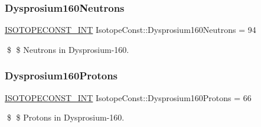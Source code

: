 \subsubsection{\texorpdfstring{Dysprosium160\+Neutrons}{Dysprosium160Neutrons}}
{\footnotesize\ttfamily \mbox{\hyperlink{group___isotope_const-_macros_ga5f18360b3e99483a35c32d789e62621c}{I\+S\+O\+T\+O\+P\+E\+C\+O\+N\+S\+T\+\_\+\+I\+NT}} Isotope\+Const\+::\+Dysprosium160\+Neutrons = 94}

\$ \$ Neutrons in Dysprosium-\/160. \mbox{\label{group___isotope_const-_dysprosium-_dy160_ga3c503660c9e9ce0a345719417b071ec7}} 
\subsubsection{\texorpdfstring{Dysprosium160\+Protons}{Dysprosium160Protons}}
{\footnotesize\ttfamily \mbox{\hyperlink{group___isotope_const-_macros_ga5f18360b3e99483a35c32d789e62621c}{I\+S\+O\+T\+O\+P\+E\+C\+O\+N\+S\+T\+\_\+\+I\+NT}} Isotope\+Const\+::\+Dysprosium160\+Protons = 66}

\$ \$ Protons in Dysprosium-\/160. 
